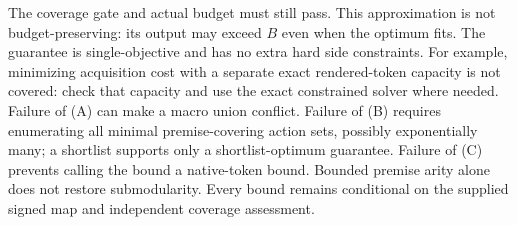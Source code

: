 The coverage gate and actual budget must still pass. This approximation is
not budget-preserving: its output may exceed $B$ even when the optimum fits.
The guarantee is single-objective and has no extra hard side constraints.
For example, minimizing acquisition cost with a separate exact rendered-token
capacity is not covered: check that capacity and use the exact constrained
solver where needed. Failure of (A) can make a macro union conflict. Failure
of (B) requires enumerating all minimal premise-covering action sets, possibly
exponentially many; a shortlist supports only a shortlist-optimum guarantee.
Failure of (C) prevents calling the bound a native-token bound. Bounded
premise arity alone does not restore submodularity. Every bound remains
conditional on the supplied signed map and independent coverage assessment.
